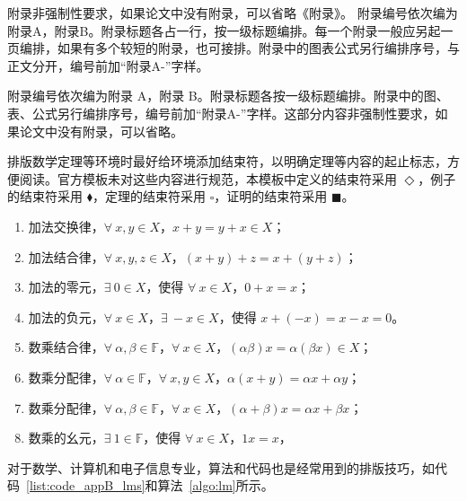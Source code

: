 \setcounter{chapter}{1}
\renewcommand{\thefigure}{\Alph{chapter}-\arabic{figure}}
\renewcommand{\thetable}{\Alph{chapter}-\arabic{table}}
\renewcommand{\theequation}{\Alph{chapter}-\arabic{equation}}
\renewcommand{\thelstlisting}{\Alph{chapter}-\arabic{lstlisting}}
\renewcommand\thealgorithm{\Alph{chapter}-\arabic{algorithm}}
\renewcommand\thesection{\Alph{chapter}.\arabic{section}}
{
    \color{red}
    附录非强制性要求，如果论文中没有附录，可以省略《附录》。
}
附录编号依次编为附录A，附录B。附录标题各占一行，按一级标题编排。每一个附录一般应另起一页编排，如果有多个较短的附录，也可接排。附录中的图表公式另行编排序号，与正文分开，编号前加“附录A-”字样。

附录编号依次编为附录 A，附录 B。附录标题各按一级标题编排。附录中的图、表、公式另行编排序号，编号前加“附录A-”字样。这部分内容非强制性要求，如果论文中没有附录，可以省略。

排版数学定理等环境时最好给环境添加结束符，以明确定理等内容的起止标志，方便阅读。官方模板未对这些内容进行规范，本模板中定义的结束符采用 $\Diamond$，例子的结束符采用 $\blacklozenge$，定理的结束符采用 $\square$，证明的结束符采用 $\blacksquare$。

\begin{enumerate}
	\item 加法交换律，$\forall~x,y \in X$，$x+y = y+x \in X$；
	\item 加法结合律，$\forall~x,y,z \in X$，$(x+y)+z = x+(y+z)$；
	\item 加法的零元，$\exists~0 \in X$，使得 $\forall~x \in X$，$0+x = x$；
	\item 加法的负元，$\forall~x \in X$，$\exists~-x \in X$，使得 $x+(-x) = x-x = 0$。
	\item 数乘结合律，$\forall~\alpha,\beta \in \mathbb{F}$，$\forall~x \in X$，$(\alpha\beta)x = \alpha(\beta x) \in X$；
	\item 数乘分配律，$\forall~\alpha \in \mathbb{F}$，$\forall~x,y \in X$，$\alpha(x+y) = \alpha x + \alpha y$；
	\item 数乘分配律，$\forall~\alpha,\beta \in \mathbb{F}$，$\forall~x \in X$，$(\alpha+\beta)x = \alpha x + \beta x$；
	\item 数乘的幺元，$\exists~1 \in \mathbb{F}$，使得 $\forall~x \in X$，$1 x = x$，
\end{enumerate}

\setcounter{chapter}{2}
对于数学、计算机和电子信息专业，算法和代码也是经常用到的排版技巧，如代码~\ref{list:code_appB_lms}和算法~\ref{algo:lm}所示。
